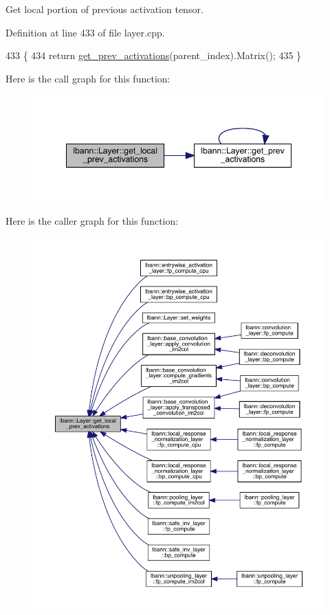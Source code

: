 Get local portion of previous activation tensor. 

Definition at line 433 of file layer.\+cpp.


\begin{DoxyCode}
433                                                        \{
434   \textcolor{keywordflow}{return} \hyperlink{classlbann_1_1Layer_a45853df73a2e72bfaa774665a0f37ed7}{get\_prev\_activations}(parent\_index).Matrix();
435 \}
\end{DoxyCode}
Here is the call graph for this function\+:\nopagebreak
\begin{figure}[H]
\begin{center}
\leavevmode
\includegraphics[width=348pt]{classlbann_1_1Layer_a35397843bb0c84030000c7d872229acb_cgraph}
\end{center}
\end{figure}
Here is the caller graph for this function\+:\nopagebreak
\begin{figure}[H]
\begin{center}
\leavevmode
\includegraphics[width=350pt]{classlbann_1_1Layer_a35397843bb0c84030000c7d872229acb_icgraph}
\end{center}
\end{figure}
